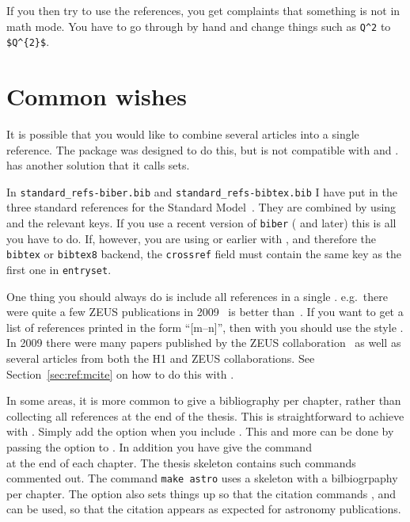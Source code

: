 If you then try to use the references, you get complaints that
something is not in math mode. You have to go through by hand and
change things such as \verb+Q^2+ to \verb+$Q^{2}$+.


\section{Common wishes}
\label{sec:ref:tips}

It is possible that you would like to combine several articles into a
single reference. The  package was designed to do this,
but is not compatible with  and
.  has another solution that it
calls sets.

In \texttt{standard\_refs-biber.bib} and
\texttt{standard\_refs-bibtex.bib} I have put in the three standard
references for the Standard Model~\cite{gsw}. They are combined by
using  and the relevant
keys. If you use a recent version of \texttt{biber} ( and later)
this is all you have to do.  If, however, you are using  or earlier with , and therefore the \texttt{bibtex} or \texttt{bibtex8} backend, the
\texttt{crossref} field must contain the same key as the first one in
\texttt{entryset}.

One thing you should always do is include all references in a single
. e.g.\ there were quite a few ZEUS publications in
2009~\cite{Chekanov:2009qja,Chekanov:2009zz,Chekanov:2009tu} is better
than~\cite{Chekanov:2009qja}\cite{Chekanov:2009zz}\cite{Chekanov:2009tu}.
If you want to get a list of references printed in the form \enquote{[m--n]},
then with  you should use the style
. In 2009 there were many papers published by the
ZEUS
collaboration~\cite{Chekanov:2009qja,Chekanov:2009zz,Chekanov:2009tu}
as well as several articles from both the H1 and ZEUS
collaborations\cite{Chekanov:2009wt,Aaron:2009wg}. See
Section~\ref{sec:ref:mcite} on how to do this with \BibTeX.

In some areas, it is more common to give a bibliography per chapter,
rather than collecting all references at the end of the thesis.
This is straightforward to achieve with .
Simply add the option  when you include .
This and more can be done by passing the option  to .
In addition you have give the command\\
 at the end of each chapter.
The thesis skeleton contains such commands commented out.
The command \texttt{make astro} uses a skeleton with a bilbiogrpaphy per chapter.
The option  also sets things up so that the  citation
commands ,  and  can be used,
so that the citation appears as expected for astronomy publications.

